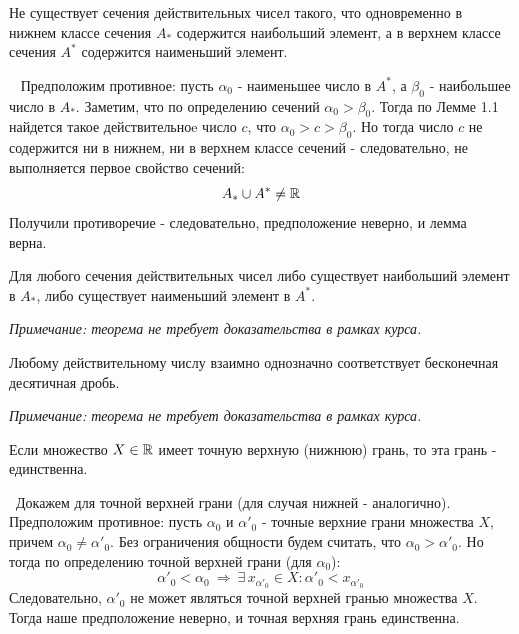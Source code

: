 \begin{lemma}
    Не существует сечения действительных чисел такого,
    что одновременно в нижнем классе сечения \(A_{*}\) содержится наибольший элемент,
    а в верхнем классе сечения \(A^{*}\) содержится наименьший элемент.

    \vspace{2mm}

    \proofname~ Предположим противное: пусть \(\alpha_{0}\) - наименьшее число в \(A^{*}\), а 
    \(\beta_{0}\) - наибольшее число в \(A_{*}\). Заметим, что по определению сечений 
    \(\alpha_{0} > \beta_{0}\).
    Тогда по Лемме 1.1 найдется такое действительноe число \(c\), что 
    \(\alpha_{0} > c > \beta_{0}\). Но тогда число \(c\) не содержится ни в нижнем,
    ни в верхнем классе сечений - следовательно, не выполняется первое свойство сечений:
    \[A_{*}\cup A^{*} \neq \mathbb{R}\]
    Получили противоречие - следовательно, предположение неверно, и лемма верна.~\qedsymbol
\end{lemma}

\begin{theorem}
    Для любого сечения действительных чисел либо существует наибольший элемент в \(A_{*}\),
    либо существует наименьший элемент в \(A^{*}\). 

    \vspace{2mm}

    \textit{Примечание: теорема не требует доказательства в рамках курса.}
\end{theorem}

\begin{theorem}
    Любому действительному числу взаимно однозначно соответствует бесконечная десятичная дробь.

    \vspace{2mm}

    \textit{Примечание: теорема не требует доказательства в рамках курса.}
\end{theorem}


\begin{theorem}
    Если множество \(X\in\mathbb{R}\) имеет точную верхную (нижнюю) грань, то эта грань - единственна.

    \vspace{2mm}

    \proofname~Докажем для точной верхней грани (для случая нижней - аналогично).\\
    Предположим противное: пусть \(\alpha_{0}\) и \(\alpha'_{0}\) - 
    точные верхние грани множества \(X\), причем \(\alpha_{0}\neq\alpha'_{0}\).
    Без ограничения общности будем считать, что \(\alpha_{0}>\alpha'_{0}\).
    Но тогда по определению точной верхней грани (для \(\alpha_{0}\)):
    \[\alpha'_{0} < \alpha_{0} ~ \Rightarrow ~ \exists\,x_{\alpha'_{0}}\in X: 
    \alpha'_{0} < x_{\alpha'_{0}}\]
    Следовательно, \(\alpha'_{0}\) не может являться точной верхней гранью множества \(X\).
    Тогда наше предположение неверно, и точная верхняя грань единственна.~\qedsymbol
\end{theorem}

